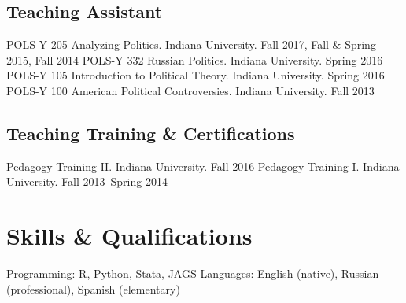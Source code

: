 \documentclass[11pt,]{article}
\begin{document}
\hypertarget{teaching-assistant}{%
\subsection{Teaching Assistant}\label{teaching-assistant}}

POLS-Y 205 Analyzing Politics. Indiana University. \hfill Fall 2017,
Fall \& Spring 2015, Fall 2014 \newline POLS-Y 332 Russian Politics.
Indiana University. \hfill Spring 2016 \newline POLS-Y 105 Introduction
to Political Theory. Indiana University. \hfill Spring 2016 \newline
POLS-Y 100 American Political Controversies. Indiana University.
\hfill Fall 2013

\hypertarget{teaching-training-certifications}{%
\subsection{Teaching Training \&
Certifications}\label{teaching-training-certifications}}

Pedagogy Training II. Indiana University. \hfill Fall 2016 \newline
Pedagogy Training I. Indiana University. \hfill Fall 2013--Spring 2014

\hypertarget{skills-qualifications}{%
\section{Skills \& Qualifications}\label{skills-qualifications}}

Programming: \textsf{R}, Python, Stata, JAGS \hfill \newline Languages:
English (native), Russian (professional), Spanish (elementary)
\end{document}
